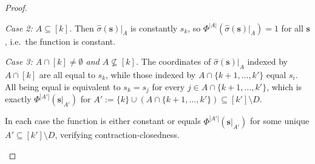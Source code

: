 \documentclass[10pt,a4paper]{amsart}
\newcommand{\vecs}{\boldsymbol{s}}
\begin{document}
\begin{proof}
\begin{enumerate}
\emph{Case 2: $A \subseteq [k]$.} Then $\hat\sigma(\vecs)|_A$ is constantly
$s_k$, so $\Phi^{|A|}(\hat\sigma(\vecs)|_A) = 1$ for all $\vecs$, i.e.\ the
function is constant.

\emph{Case 3: $A \cap [k] \neq \emptyset$ and $A \not\subseteq [k]$.} The
coordinates of $\hat\sigma(\vecs)|_A$ indexed by $A \cap [k]$ are all
equal to $s_k$, while those indexed by $A \cap \{k+1,\dots,k'\}$ equal
$s_i$. All being equal is equivalent to $s_k = s_j$ for every $j \in
A \cap \{k+1,\dots,k'\}$, which is exactly
$\Phi^{|A'|}(\vecs|_{A'})$ for $A' := \{k\} \cup (A \cap
\{k+1,\dots,k'\}) \subseteq [k'] \setminus D$.

In each case the function is either constant or equals
$\Phi^{|A'|}(\vecs|_{A'})$ for some unique $A' \subseteq [k'] \setminus D$,
verifying contraction-closedness. \qedhere
\end{enumerate}
\end{proof}
\end{document}
